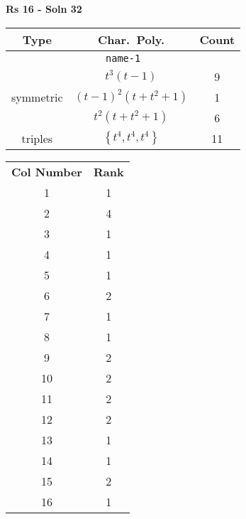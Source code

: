 \documentclass{article}
\begin{document}
    \textbf{Rs 16 - Soln 32}
    \begin{table}
    \begin{tabular}{|c|c|c|}
    \hline
    \textbf{Type} & \textbf{Char.~Poly.} & \textbf{Count} \\
    \hline \multicolumn{3}{|c|}{\texttt{name-1}} \\ \hline
    \multirow{3}{*}{symmetric}
    & $t^3(t - 1)$ & 9 \\
    & $(t - 1)^2(t + t^2 + 1)$ & 1 \\
    & $t^2(t + t^2 + 1)$ & 6 \\
    \hline
    \multirow{1}{*}{triples}
    & $\left\{t^4,t^4,t^4\right\}$ & 11 \\
    \hline
    \end{tabular}
    \end{table}
    \begin{table}
    \begin{tabular}{|c|c|}
    \hline
    \textbf{Col Number} & \textbf{Rank}\\
    1 & 1 \\ 
    2 & 4 \\ 
    3 & 1 \\ 
    4 & 1 \\ 
    5 & 1 \\ 
    6 & 2 \\ 
    7 & 1 \\ 
    8 & 1 \\ 
    9 & 2 \\ 
    10 & 2 \\ 
    11 & 2 \\ 
    12 & 2 \\ 
    13 & 1 \\ 
    14 & 1 \\ 
    15 & 2 \\ 
    16 & 1 \\ 
    \hline
    \end{tabular}
    \end{table}
    \newpage
\end{document}
